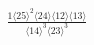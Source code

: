 \documentclass[varwidth, border=5pt]{standalone}
\begin{document}
\begin{my}
$\begin{gathered}
\scriptscriptstyle\frac{1⟨25⟩^2⟨24⟩⟨12⟩⟨13⟩}{⟨14⟩^3⟨23⟩^3}
\end{gathered}$
\end{my}
\end{document}
